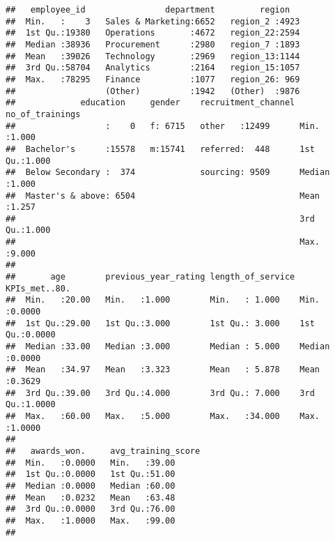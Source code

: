 \documentclass[
]{article}
\begin{document}
\begin{verbatim}
##   employee_id                department         region    
##  Min.   :    3   Sales & Marketing:6652   region_2 :4923  
##  1st Qu.:19380   Operations       :4672   region_22:2594  
##  Median :38936   Procurement      :2980   region_7 :1893  
##  Mean   :39026   Technology       :2969   region_13:1144  
##  3rd Qu.:58704   Analytics        :2164   region_15:1057  
##  Max.   :78295   Finance          :1077   region_26: 969  
##                  (Other)          :1942   (Other)  :9876  
##             education     gender    recruitment_channel no_of_trainings
##                  :    0   f: 6715   other   :12499      Min.   :1.000  
##  Bachelor's      :15578   m:15741   referred:  448      1st Qu.:1.000  
##  Below Secondary :  374             sourcing: 9509      Median :1.000  
##  Master's & above: 6504                                 Mean   :1.257  
##                                                         3rd Qu.:1.000  
##                                                         Max.   :9.000  
##                                                                        
##       age        previous_year_rating length_of_service KPIs_met..80.   
##  Min.   :20.00   Min.   :1.000        Min.   : 1.000    Min.   :0.0000  
##  1st Qu.:29.00   1st Qu.:3.000        1st Qu.: 3.000    1st Qu.:0.0000  
##  Median :33.00   Median :3.000        Median : 5.000    Median :0.0000  
##  Mean   :34.97   Mean   :3.323        Mean   : 5.878    Mean   :0.3629  
##  3rd Qu.:39.00   3rd Qu.:4.000        3rd Qu.: 7.000    3rd Qu.:1.0000  
##  Max.   :60.00   Max.   :5.000        Max.   :34.000    Max.   :1.0000  
##                                                                         
##   awards_won.     avg_training_score
##  Min.   :0.0000   Min.   :39.00     
##  1st Qu.:0.0000   1st Qu.:51.00     
##  Median :0.0000   Median :60.00     
##  Mean   :0.0232   Mean   :63.48     
##  3rd Qu.:0.0000   3rd Qu.:76.00     
##  Max.   :1.0000   Max.   :99.00     
## 
\end{verbatim}
\end{document}
